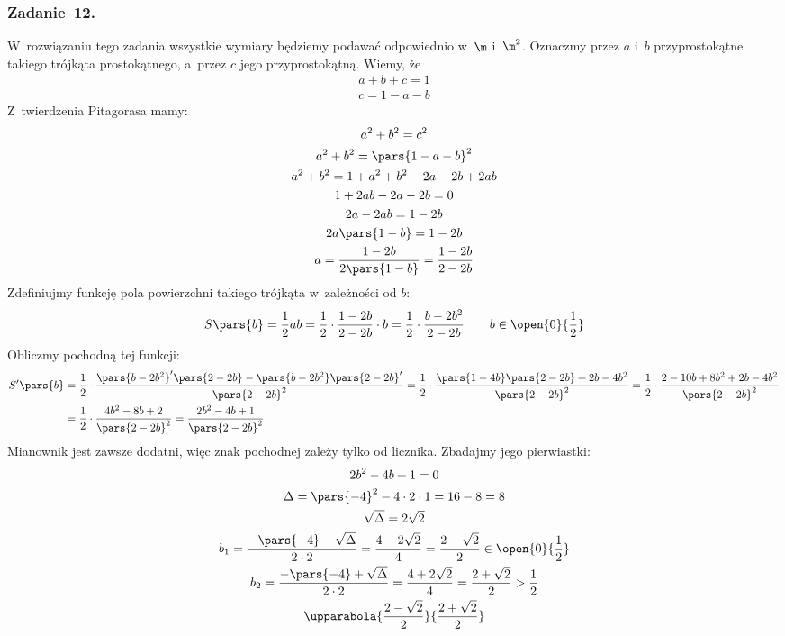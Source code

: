 \subsubsection*{Zadanie~12.}
W~rozwiązaniu tego zadania wszystkie wymiary będziemy podawać odpowiednio w~\(\m\) i~\(\m^2\). Oznaczmy przez \(a\) i~\(b\) przyprostokątne takiego trójkąta prostokątnego, a~przez \(c\) jego przyprostokątną. Wiemy, że
\begin{gather*}
    a + b + c = 1\\
    c = 1 - a - b
\end{gather*}
Z~twierdzenia Pitagorasa mamy:
\begin{gather*}
    a^2 + b^2 = c^2\\
    a^2 + b^2 = \pars{1 - a - b}^2\\
    a^2 + b^2 = 1 + a^2 + b^2 - 2a - 2b + 2ab\\
    1 + 2ab - 2a - 2b = 0\\
    2a - 2ab = 1 - 2b\\
    2a\pars{1 - b} = 1 - 2b\\
    a = \frac{1 - 2b}{2\pars{1 - b}} = \frac{1 - 2b}{2 - 2b}
\end{gather*}
Zdefiniujmy funkcję pola powierzchni takiego trójkąta w~zależności od \(b\):
\begin{equation*}
    S\pars{b}
        = \frac{1}{2}ab
        = \frac{1}{2} \cdot \frac{1 - 2b}{2 - 2b} \cdot b
        = \frac{1}{2} \cdot \frac{b - 2b^2}{2 - 2b} \qquad b \in \open{0}{\frac{1}{2}}
\end{equation*}
Obliczmy pochodną tej funkcji:
\begin{equation*}
    \begin{split}
        S'\pars{b}
            &= \frac{1}{2} \cdot \frac{\pars{b - 2b^2}'\pars{2 - 2b} - \pars{b - 2b^2}\pars{2 - 2b}'}{\pars{2 - 2b}^2}
            = \frac{1}{2} \cdot \frac{\pars{1 - 4b}\pars{2 - 2b} + 2b - 4b^2}{\pars{2 - 2b}^2}
            = \frac{1}{2} \cdot \frac{2 - 10b + 8b^2 + 2b - 4b^2}{\pars{2 - 2b}^2}\\
            &= \frac{1}{2} \cdot \frac{4b^2 - 8b + 2}{\pars{2 - 2b}^2}
            = \frac{2b^2 - 4b + 1}{\pars{2 - 2b}^2}
    \end{split}
\end{equation*}
Mianownik jest zawsze dodatni, więc znak pochodnej zależy tylko od licznika. Zbadajmy jego pierwiastki:
\begin{gather*}
    2b^2 - 4b + 1 = 0\\
    \Delta
        = \pars{-4}^2 - 4 \cdot 2 \cdot 1
        = 16 - 8
        = 8\\
    \sqrt{\Delta}
        = 2\sqrt{2}\\
    b_1
        = \frac{-\pars{-4} - \sqrt{\Delta}}{2 \cdot 2}
        = \frac{4 - 2\sqrt{2}}{4}
        = \frac{2 - \sqrt{2}}{2} \in \open{0}{\frac{1}{2}}\\
    b_2
        = \frac{-\pars{-4} + \sqrt{\Delta}}{2 \cdot 2}
        = \frac{4 + 2\sqrt{2}}{4}
        = \frac{2 + \sqrt{2}}{2} > \frac{1}{2}\\
    \upparabola{\frac{2 - \sqrt{2}}{2}}{\frac{2 + \sqrt{2}}{2}}
\end{gather*}

